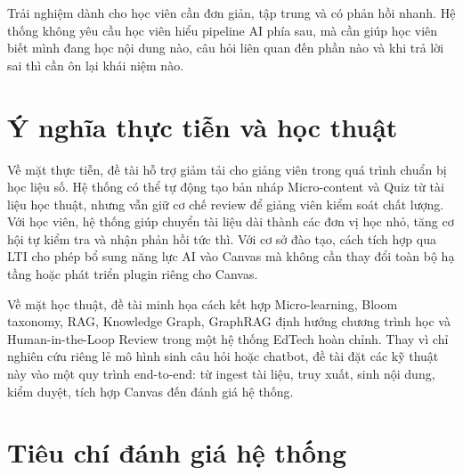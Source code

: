 Trải nghiệm dành cho học viên cần đơn giản, tập trung và có phản hồi nhanh.
Hệ thống không yêu cầu học viên hiểu pipeline AI phía sau, mà cần giúp học
viên biết mình đang học nội dung nào, câu hỏi liên quan đến phần nào và khi
trả lời sai thì cần ôn lại khái niệm nào.

\section{Ý nghĩa thực tiễn và học thuật}

Về mặt thực tiễn, đề tài hỗ trợ giảm tải cho giảng viên trong quá trình chuẩn
bị học liệu số. Hệ thống có thể tự động tạo bản nháp Micro-content và Quiz từ
tài liệu học thuật, nhưng vẫn giữ cơ chế review để giảng viên kiểm soát chất
lượng. Với học viên, hệ thống giúp chuyển tài liệu dài thành các đơn vị học
nhỏ, tăng cơ hội tự kiểm tra và nhận phản hồi tức thì. Với cơ sở đào tạo, cách
tích hợp qua LTI cho phép bổ sung năng lực AI vào Canvas mà không cần thay đổi
toàn bộ hạ tầng hoặc phát triển plugin riêng cho Canvas.

Về mặt học thuật, đề tài minh họa cách kết hợp Micro-learning, Bloom taxonomy,
RAG, Knowledge Graph, GraphRAG định hướng chương trình học và
Human-in-the-Loop Review trong một hệ thống EdTech hoàn chỉnh. Thay vì chỉ
nghiên cứu riêng lẻ mô hình sinh câu hỏi hoặc chatbot, đề tài đặt các kỹ thuật
này vào một
quy trình end-to-end: từ ingest tài liệu, truy xuất, sinh nội dung, kiểm duyệt,
tích hợp Canvas đến đánh giá hệ thống.

\section{Tiêu chí đánh giá hệ thống}

